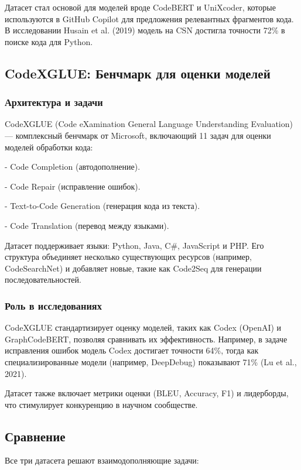 \documentclass[14pt]{article}
\theoremstyle{definition}
\begin{document}
Датасет стал основой для моделей вроде CodeBERT и UniXcoder, которые используются в GitHub Copilot для предложения релевантных фрагментов кода. В исследовании Husain et al. (2019) модель на CSN достигла точности 72\% в поиске кода для Python.



\newpage

\subsection{CodeXGLUE: Бенчмарк для оценки моделей}

\subsubsection{Архитектура и задачи}
CodeXGLUE (Code eXamination General Language Understanding Evaluation) — комплексный бенчмарк от Microsoft, включающий 11 задач для оценки моделей обработки кода:

    
- Code Completion (автодополнение).
    
- Code Repair (исправление ошибок).
    
- Text-to-Code Generation (генерация кода из текста).
    
- Code Translation (перевод между языками).


Датасет поддерживает языки: Python, Java, C\#, JavaScript и PHP. Его структура объединяет несколько существующих ресурсов (например, CodeSearchNet) и добавляет новые, такие как Code2Seq для генерации последовательностей.

\subsubsection{Роль в исследованиях}
CodeXGLUE стандартизирует оценку моделей, таких как Codex (OpenAI) и GraphCodeBERT, позволяя сравнивать их эффективность. Например, в задаче исправления ошибок модель Codex достигает точности 64\%, тогда как специализированные модели (например, DeepDebug) показывают 71\% (Lu et al., 2021).

Датасет также включает метрики оценки (BLEU, Accuracy, F1) и лидерборды, что стимулирует конкуренцию в научном сообществе.



\newpage

\subsection{Сравнение}
Все три датасета решают взаимодополняющие задачи:
\end{document}

